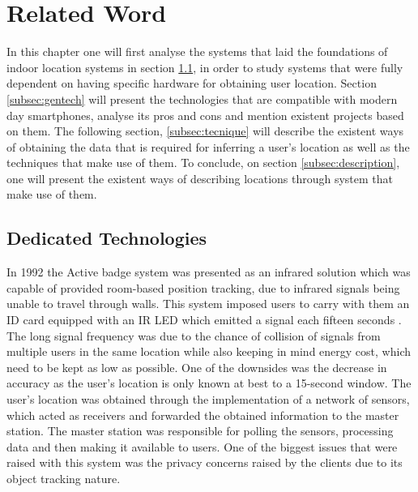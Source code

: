 \documentclass[a4paper]{IEEEtran}
\begin{document}
 
\section{Related Word} 
\label{sec:related} 
 
 
In this chapter one will first analyse the systems that laid the foundations of indoor location systems in section \ref{subsec:dedicated}, in order to study systems that were fully dependent on having specific hardware for obtaining user location. Section \ref{subsec:gentech} will present the technologies that are compatible with modern day smartphones, analyse its pros and cons and mention existent projects based on them. The following section, \ref{subsec:tecnique} will describe the existent ways of obtaining the data that is required for inferring a user's location as well as the techniques that make use of them. To conclude, on section \ref{subsec:description}, one will present the existent ways of describing locations through system that make use of them. 
 
 
\subsection{Dedicated Technologies} 
\label{subsec:dedicated} 
 
 
In 1992 the Active badge system \cite{badge} was presented as an infrared solution which was capable of provided room-based position tracking, due to infrared signals being unable to travel through walls. This system imposed users to carry with them an ID card equipped with an IR LED which emitted a signal each fifteen seconds \cite{badge1, badge2}. The long signal frequency was due to the chance of collision of signals from multiple users in the same location while also keeping in mind energy cost, which need to be kept as low as possible. One of the downsides was the decrease in accuracy as the user's location is only known at best to a 15-second window. The user's location was obtained  through the implementation of a network of sensors, which acted as receivers and forwarded the obtained information to the master station. The master station was responsible for polling the sensors, processing data and then making it available to users. One of the biggest issues that were raised with this system was the privacy concerns raised by the clients due to its object tracking nature. 
 
\end{document}
